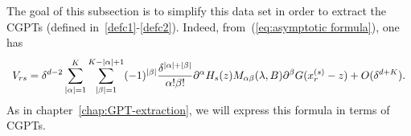 The goal of this subsection is to simplify this data set in order
to extract the CGPTs (defined in~\eqref{defc1}-\eqref{defc2}).
Indeed, from~(\ref{eq:asymptotic formula}), one has
\begin{equation}\begin{array}{l}
\displaystyle
V_{rs}=\delta^{d-2}\sum_{\left|\alpha\right|=1}^{K}\sum_{\left|\beta\right|=1}^{K-\left|\alpha\right|+1}(-1)^{\vert\beta
\vert}\frac{\delta^{\left|\alpha\right|+\left|\beta\right|}}{\alpha!\beta!}\partial^{\alpha}H_{s}(z)
M_{\alpha\beta}(\lambda,B)\partial^{\beta}G(x^{(s)}_{r}-z)+O(\delta^{d+K}).\label{eq:Qsr}
\end{array} \end{equation} As in chapter~\ref{chap:GPT-extraction}, we will express this formula
in terms of CGPTs.
